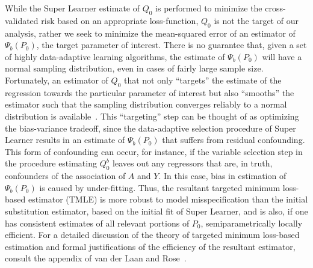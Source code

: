 While the Super Learner estimate of $Q_0$ is performed to minimize the
cross-validated risk based on an appropriate loss-function, $Q_0$ is not the
target of our analysis, rather we seek to minimize the mean-squared error of an
estimator of $\Psi_b(P_0)$, the target parameter of interest. There is no
guarantee that, given a set of highly data-adaptive learning algorithms, the
estimate of $\Psi_b(P_0)$ will have a normal sampling distribution, even in
cases of fairly large sample size. Fortunately, an estimator of $Q_0$ that not
only ``targets'' the estimate of the regression towards the particular parameter
of interest but also ``smooths'' the estimator such that the sampling
distribution converges reliably to a normal distribution is
available~\cite{van2011targeted}. This ``targeting'' step can be thought of as
optimizing the bias-variance tradeoff, since the data-adaptive selection
procedure of Super Learner results in an estimate of $\Psi_b(P_0)$ that suffers
from residual confounding. This form of confounding can occur, for instance, if
the variable selection step in the procedure estimating $Q^b_0$ leaves out any
regressors that are, in truth, confounders of the association of $A$ and $Y$. In
this case, bias in estimation of $\Psi_b(P_0)$ is caused by under-fitting. Thus,
the resultant targeted minimum loss-based estimator (TMLE) is more robust to
model misspecification than the initial substitution estimator, based on the
initial fit of Super Learner, and is also, if one has consistent estimates of
all relevant portions of $P_0$, semiparametrically locally efficient. For a
detailed discussion of the theory of targeted minimum loss-based estimation and
formal justifications of the efficiency of the resultant estimator, consult the
appendix of van der Laan and Rose~\cite{van2011targeted}.

